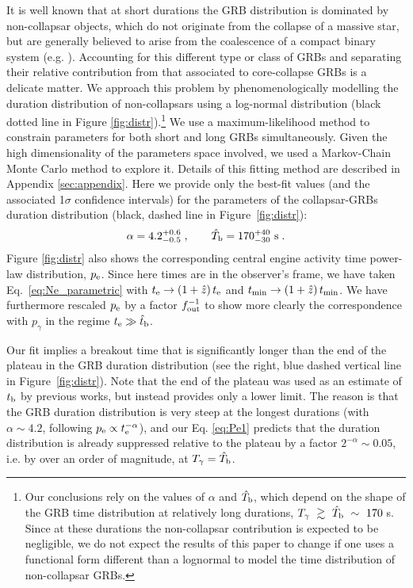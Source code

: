 \documentclass[useAMS,usenatbib]{mn2e}
\begin{document}
It is well known that at short durations the GRB distribution is dominated by non-collapsar objects, which do not originate from the collapse of a massive star, but are generally believed to arise from the coalescence of a compact binary system (e.g. \citealt{Nakar2007}). Accounting for this different type or class of GRBs and separating their relative contribution from that associated to core-collapse GRBs is a delicate matter. We approach this problem by phenomenologically modelling the duration distribution of non-collapsars using a log-normal distribution (black dotted line in Figure \ref{fig:distr}).\footnote{Our conclusions rely on the values of $\alpha$ and $\hat{T}_{\rm b}$, which depend on the shape of the GRB time distribution at relatively long durations, $T_\gamma~\gtrsim~\hat{T}_{\rm b}~\sim~170\;$s. Since at these durations the non-collapsar contribution is expected to be negligible, we do not expect the results of this paper to change if one uses a functional form different than a lognormal to model the time distribution of non-collapsar GRBs.} We use a maximum-likelihood method to constrain parameters for both short and long GRBs simultaneously. Given the high dimensionality of the parameters space involved, we used a Markov-Chain Monte Carlo method to explore it. Details of this fitting method are described in Appendix \ref{sec:appendix}. Here we provide only the best-fit values (and the associated 1$\sigma$ confidence intervals) for the parameters of the collapsar-GRBs duration distribution (black, dashed line in Figure~\ref{fig:distr}):
\begin{equation}
\label{eq:fit_res}
\alpha=4.2_{-0.5}^{+0.6}\;, \qquad \hat{T}_{\rm b}=170_{-30}^{+40}\text{ s}\;.
\end{equation}
Figure \ref{fig:distr} also shows the corresponding central engine activity time power-law distribution, $p_{\rm e}$. Since here times are in the observer's frame, we have taken Eq.~\eqref{eq:Ne_parametric} with $t_{\rm e}\to\left(1+\hat{z}\right)t_{\rm e}$ and $t_{\rm min}\to\left(1+\hat{z}\right)t_{\rm min}$. We have furthermore rescaled $p_{\rm e}$ by a factor $f_{\rm out}^{-1}$ to show more clearly the correspondence with $p_\gamma$ in the regime $t_{\rm e}\gg \hat{t}_{\rm b}$.

Our fit implies a breakout time that is significantly longer than the end of the plateau in the GRB duration distribution (see the right, blue dashed vertical line in Figure~\ref{fig:distr}). Note that the end of the plateau was used as an estimate of $t_{\rm b}$ by previous works, but instead provides only a lower limit. The reason is that the GRB duration distribution is very steep at the longest durations (with $\alpha\sim 4.2$, following $p_{\rm e}\propto t_{\rm e}^{-\alpha}$), and our Eq. \eqref{eq:Pe1} predicts that the duration distribution is already suppressed relative to the plateau by a factor $2^{-\alpha}\sim 0.05$, i.e. by over an order of magnitude, at $T_\gamma=\hat{T}_{\rm b}$.
\end{document}
